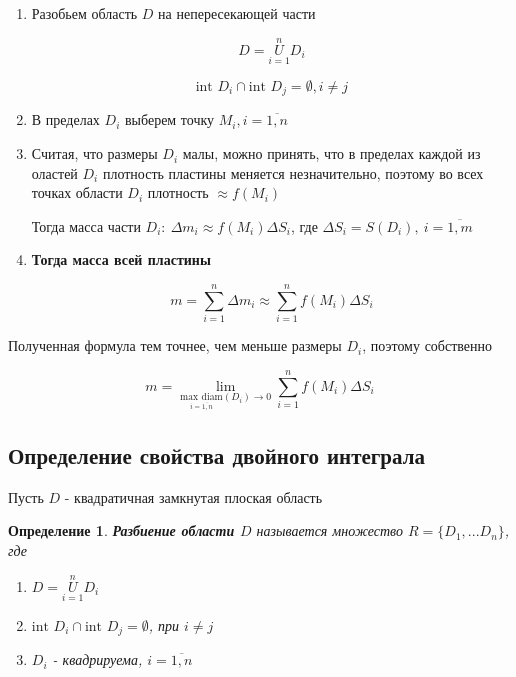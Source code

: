\documentclass[a4paper, 14pt]{report}
\newtheorem{defenition}{Определение}[section]
\begin{document}
\begin{enumerate}
    \item[1)] Разобьем область $D$ на непересекающей части
    
    $$ D = \overset{n}{\underset{i=1}{U}} D_i $$
    
    $$ \text{int } D_i \cap \text{int } D_j = \emptyset, i \ne j $$
    
    \item[2)] В пределах $D_i$ выберем точку $M_i, i = \overline{1,n}$
    \item[3)] Считая, что размеры $D_i$ малы, можно принять, что в пределах каждой из оластей $D_i$ плотность пластины меняется незначительно, поэтому во всех точках области $D_i$ плотность $\approx f(M_i)$ 

    Тогда масса части $D_i:\ \Delta m_i \approx f(M_i) \Delta S_i$, где $\Delta S_i = S(D_i),\ i = \overline{1, m}$

    \item[4)] \textbf{Тогда масса всей пластины}
    
    $$ m = \sum_{i=1}^n \Delta m_i \approx \sum_{i=1}^n f(M_i) \Delta S_i $$

\end{enumerate}

Полученная формула тем точнее, чем меньше размеры $D_i$, поэтому собственно

$$ m = \lim_{\underset{i = \overline{1,n}}{\text{max diam}} (D_i) \to 0} \sum_{i=1}^n f(M_i) \Delta S_i $$

\subsection{Определение свойства двойного интеграла}

Пусть $D$ - квадратичная замкнутая плоская область

\begin{defenition}
    \textbf{Разбиение области $D$} называется множество $R = \{ D_1, ... D_n\}$, где 

\begin{enumerate}
    \item[1)] $D = \underset{i=1}{\overset{n}{U}} D_i$
    \item[2)] $\text{int } D_i \cap \text{int } D_j = \emptyset$, при $i \ne j$
    \item[3)] $D_i$ - квадрируема, $i = \overline{1,n}$
\end{enumerate}
\end{defenition}
\end{document}
